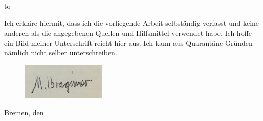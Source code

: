 
\thispagestyle{empty}
\vspace*{32\baselineskip}
\hbox to \textwidth{\hrulefill}
\par

\noindent Ich erkläre hiermit, dass ich die vorliegende Arbeit selbständig verfasst und
keine anderen als die angegebenen Quellen und Hilfsmittel verwendet habe. Ich hoffe ein Bild meiner Unterschrift reicht hier aus. Ich kann aus Quarantäne Gründen nämlich nicht selber unterschreiben.
\begin{figure}[H]
  \centering
  \includegraphics[width=40mm ,scale=0.4]{Unterschrift.png}
\end{figure}
\par
\vspace*{4\baselineskip}
\noindent Bremen, den  \timeend



\clearpage






